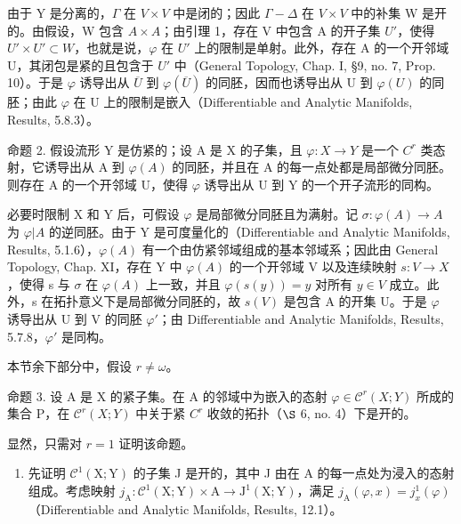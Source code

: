 由于 Y 是分离的，\(\varGamma\) 在 \(V \times V\) 中是闭的；因此 \(\varGamma - \varDelta\) 在 \(V \times V\) 中的补集 W 是开的。由假设，W 包含 \(A \times A\)；由引理 1，存在 V 中包含 A 的开子集 \(U'\)，使得 \(U' \times U' \subset W\)，也就是说，\(\varphi\) 在 \(U'\) 上的限制是单射。此外，存在 A 的一个开邻域 U，其闭包是紧的且包含于 \(U'\) 中（General Topology, Chap. I, §9, no. 7, Prop. 10）。于是 \(\varphi\) 诱导出从 \(\overline{U}\) 到 \(\varphi(\overline{U})\) 的同胚，因而也诱导出从 U 到 \(\varphi(U)\) 的同胚；由此 \(\varphi\) 在 U 上的限制是嵌入（Differentiable and Analytic Manifolds, Results, 5.8.3）。

命题 2. 假设流形 Y 是仿紧的；设 A 是 X 的子集，且 \(\varphi : X \to Y\) 是一个 \(C^r\) 类态射，它诱导出从 A 到 \(\varphi(A)\) 的同胚，并且在 A 的每一点处都是局部微分同胚。则存在 A 的一个开邻域 U，使得 \(\varphi\) 诱导出从 U 到 Y 的一个开子流形的同构。

必要时限制 X 和 Y 后，可假设 \(\varphi\) 是局部微分同胚且为满射。记 \(\sigma : \varphi(A) \to A\) 为 \(\varphi|A\) 的逆同胚。由于 Y 是可度量化的（Differentiable and Analytic Manifolds, Results, 5.1.6），\(\varphi(A)\) 有一个由仿紧邻域组成的基本邻域系；因此由 General Topology, Chap. XI，存在 Y 中 \(\varphi(A)\) 的一个开邻域 V 以及连续映射 \(s : V \to X\)，使得 s 与 \(\sigma\) 在 \(\varphi(A)\) 上一致，并且 \(\varphi(s(y)) = y\) 对所有 \(y \in V\) 成立。此外，s 在拓扑意义下是局部微分同胚的，故 \(s(V)\) 是包含 A 的开集 U。于是 \(\varphi\) 诱导出从 U 到 V 的同胚 \(\varphi'\)；由 Differentiable and Analytic Manifolds, Results, 5.7.8，\(\varphi'\) 是同构。

本节余下部分中，假设 \(r \neq \omega\)。

命题 3. 设 A 是 X 的紧子集。在 A 的邻域中为嵌入的态射 \(\varphi \in \mathcal{C}^{r}(X;Y)\) 所成的集合 P，在 \(\mathcal{C}^{r}(X;Y)\) 中关于紧 \(C^{r}\) 收敛的拓扑（\(\S\) 6, no. 4）下是开的。

显然，只需对 \(r = 1\) 证明该命题。

\begin{enumerate}
\def\labelenumi{\alph{enumi})}
\tightlist
\item
  先证明 \(\mathcal{C}^{1}(\mathrm{X};\mathrm{Y})\) 的子集 J 是开的，其中 J 由在 A 的每一点处为浸入的态射组成。考虑映射 \(j_{\mathrm{A}}:\mathcal{C}^{1}(\mathrm{X};\mathrm{Y})\times\mathrm{A}\to\mathrm{J}^{1}(\mathrm{X};\mathrm{Y})\)，满足 \(j_{\mathrm{A}}(\varphi,x)=j_{x}^{1}(\varphi)\)（Differentiable and Analytic Manifolds, Results, 12.1）。
\end{enumerate}


